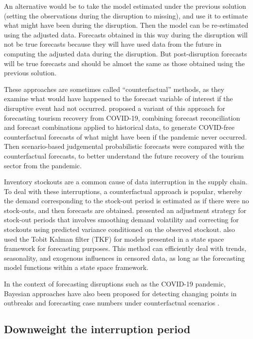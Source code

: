 \documentclass[
  11pt,
  a4paper,
]{article}
\begin{document}
An alternative would be to take the model estimated under the previous
solution (setting the observations during the disruption to missing),
and use it to estimate what might have been during the disruption. Then
the model can be re-estimated using the adjusted data. Forecasts
obtained in this way during the disruption will not be true forecasts
because they will have used data from the future in computing the
adjusted data during the disruption. But post-disruption forecasts will
be true forecasts and should be almost the same as those obtained using
the previous solution.

These approaches are sometimes called ``counterfactual'' methods, as
they examine what would have happened to the forecast variable of
interest if the disruptive event had not occurred.
\textcite{athanasopoulos2023probabilistic} proposed a variant of this
approach for forecasting tourism recovery from COVID-19, combining
forecast reconciliation and forecast combinations applied to historical
data, to generate COVID-free counterfactual forecasts of what might have
been if the pandemic never occurred. Then scenario-based judgemental
probabilistic forecasts were compared with the counterfactual forecasts,
to better understand the future recovery of the tourism sector from the
pandemic.

Inventory stockouts are a common cause of data interruption in the
supply chain. To deal with these interruptions, a counterfactual
approach is popular, whereby the demand corresponding to the stock-out
period is estimated as if there were no stock-outs, and then forecasts
are obtained. \textcite{Bell2000} presented an adjustment strategy for
stock-out periods that involves smoothing demand volatility and
correcting for stockouts using predicted variance conditioned on the
observed stockout. \textcite{trapero2023demand} also used the Tobit
Kalman filter (TKF) for models presented in a state space framework for
forecasting purposes. This method can efficiently deal with trends,
seasonality, and exogenous influences in censored data, as long as the
forecasting model functions within a state space framework.

In the context of forecasting disruptions such as the COVID-19 pandemic,
Bayesian approaches have also been proposed for detecting changing
points in outbreaks and forecasting case numbers under counterfactual
scenarios \autocite{dehning2020inferring}.

\subsection{Downweight the interruption
period}\label{downweight-the-interruption-period}
\end{document}
